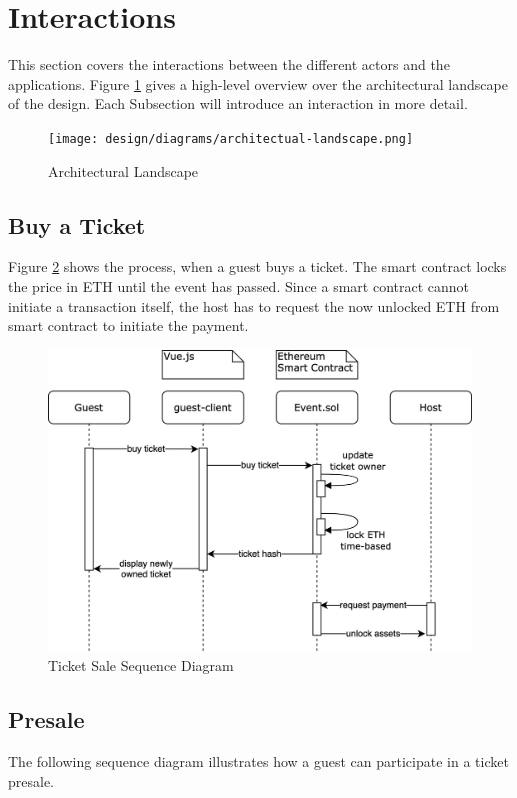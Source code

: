 \section{Interactions}
This section covers the interactions between the different actors and the applications. Figure \ref{fig:architecture} gives a high-level overview over the architectural landscape of the design. Each Subsection will introduce an interaction in more detail.

\begin{figure}[H]
    \centering
    \texttt{[image: design/diagrams/architectual-landscape.png]}
    \caption{Architectural Landscape}
    \label{fig:architecture}
\end{figure}

\subsection{Buy a Ticket}
Figure \ref{fig:buyticket-sequence-diagram} shows the process, when a guest buys a ticket. The smart contract locks the price in ETH until the event has passed. Since a smart contract cannot initiate a transaction itself, the host has to request the now unlocked ETH from smart contract to initiate the payment.
\begin{figure}[H]
    \centering
    \includegraphics[width=16cm]{design/diagrams/BuyTicket.png}
    \caption{Ticket Sale Sequence Diagram}
    \label{fig:buyticket-sequence-diagram}
\end{figure}

\subsection{Presale}
The following sequence diagram illustrates how a guest can participate in a ticket presale.

